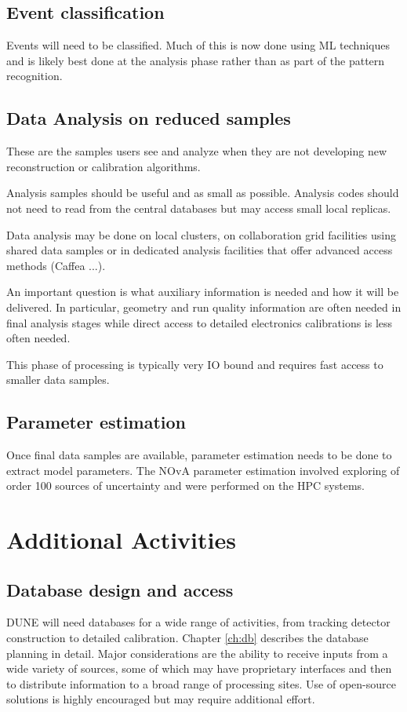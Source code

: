 \documentclass[../main-v1.tex]{subfiles}
\begin{document}
\subsection{Event classification}
Events will need to be classified.  Much of this is now done using ML techniques and is likely best done at the analysis phase rather than as part of the pattern recognition. 



\subsection{Data Analysis on reduced samples }
These are the samples users see and analyze when they are not developing new reconstruction  or calibration algorithms. 

Analysis samples should be useful and as small as possible.  Analysis codes should not need to read from the central databases but may access small local replicas. 

Data analysis may be done on local clusters, on collaboration grid facilities using shared data samples or in dedicated analysis facilities that offer advanced access methods (Caffea ...). 

An important question is what auxiliary information is needed and how it will be delivered. In particular, geometry and run quality information are often needed in final analysis stages while direct access to detailed electronics calibrations is less often needed. 

This phase of processing is typically very IO bound and requires fast access to smaller data samples. 

\subsection{Parameter estimation}
Once final data samples are available, parameter estimation needs to be done to extract model parameters.  The NOvA parameter estimation \cite{NOvA:2021nfi} involved exploring of order 100 sources of uncertainty and were performed on the  HPC systems. 

\section{Additional Activities}

\subsection{Database design and access}
DUNE will need databases for a wide range of activities, from tracking detector construction to detailed calibration.  Chapter \ref{ch:db} describes the database planning in detail.  Major considerations are the ability to  receive inputs from a wide variety of sources, some of which may have proprietary interfaces and then to distribute information to a broad range of processing sites.   Use of open-source solutions is highly encouraged but may require additional effort.
\end{document}
